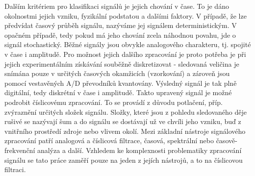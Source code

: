 \documentclass[a4paper, 12pt]{article}
\begin{document}
\newline
Dalším kritériem pro klasifikaci signálů je jejich chování v čase. To je dáno okolnostmi jejich vzniku, fyzikální podstatou a dalšími faktory. V případě, že lze předvídat časový průběh signálu, nazýváme jej signálem deterministickým. V opačném případě, tedy pokud má jeho chování zcela náhodnou povahu, jde o signál stochastický.
Běžné signály jsou obvykle analogového charakteru, tj. spojité v čase i amplitudě. Pro možnost jejich dalšího zpracování je proto potřeba je při jejich experimentálním získávání souběžně diskretizovat - sledovaná veličina je snímána pouze v určitých časových okamžicích (vzorkování) a zároveň jsou pomocí vestavěných A/D převodníků kvantovány. Výsledný signál je tak plně digitální, tedy diskrétní v čase i amplitudě. Takto upravený signál je možné podrobit číslicovému zpracování.
To se provádí z důvodu potlačení, příp. zvýraznění určitých složek signálu. Složky, které jsou z pohledu sledovaného děje rušivé se nazývají šum a do signálu se dostávají už ve chvíli jeho vzniku, buď z vnitřního prostředí zdroje nebo vlivem okolí. Mezi základní nástroje signálového zpracování patří
analogová a číslicová filtrace, časová, spektrální nebo časově-frekvenční analýza a další. Vzhledem ke komplexnosti problematiky zpracování signálu se tato práce zaměří pouze na jeden z jejích nástrojů, a to na číslicovou filtraci.

\end{document}

